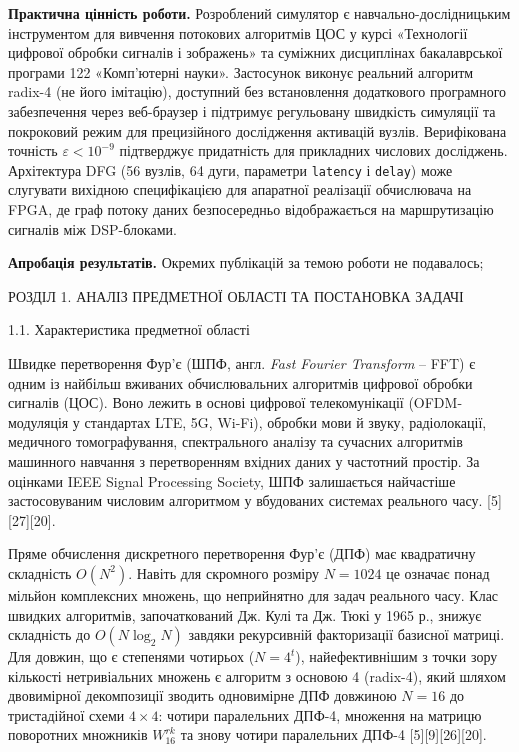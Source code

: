\documentclass[
]{article}
\newcommand{\passthrough}[1]{#1}
\begin{document}
\textbf{Практична цінність роботи.} Розроблений симулятор є
навчально-дослідницьким інструментом для вивчення потокових алгоритмів
ЦОС у курсі «Технології цифрової обробки сигналів і зображень» та
суміжних дисциплінах бакалаврської програми 122 «Комп'ютерні науки».
Застосунок виконує реальний алгоритм radix-4 (не його імітацію),
доступний без встановлення додаткового програмного забезпечення через
веб-браузер і підтримує регульовану швидкість симуляції та покроковий
режим для прецизійного дослідження активацій вузлів. Верифікована
точність \(\varepsilon < 10^{- 9}\) підтверджує придатність для
прикладних числових досліджень. Архітектура DFG (56 вузлів, 64 дуги,
параметри \passthrough{\lstinline!latency!} і
\passthrough{\lstinline!delay!}) може слугувати вихідною специфікацією
для апаратної реалізації обчислювача на FPGA, де граф потоку даних
безпосередньо відображається на маршрутизацію сигналів між DSP-блоками.

\textbf{Апробація результатів.} Окремих публікацій за темою роботи не
подавалось;

\protect{}\label{_Toc230737378}{}РОЗДІЛ 1. АНАЛІЗ
ПРЕДМЕТНОЇ ОБЛАСТІ ТА ПОСТАНОВКА ЗАДАЧІ

\protect{}\label{X351ee226d926b4af0b1030921408efbb323dbf0}{}1.1.
Характеристика предметної області

Швидке перетворення Фур'є (ШПФ, англ. \emph{Fast Fourier Transform} --
FFT) є одним із найбільш вживаних обчислювальних алгоритмів цифрової
обробки сигналів (ЦОС). Воно лежить в основі цифрової телекомунікації
(OFDM-модуляція у стандартах LTE, 5G, Wi-Fi), обробки мови й звуку,
радіолокації, медичного томографування, спектрального аналізу та
сучасних алгоритмів машинного навчання з перетворенням вхідних даних у
частотний простір. За оцінками IEEE Signal Processing Society, ШПФ
залишається найчастіше застосовуваним числовим алгоритмом у вбудованих
системах реального часу. {[}5{]}{[}27{]}{[}20{]}.

Пряме обчислення дискретного перетворення Фур'є (ДПФ) має квадратичну
складність \(O(N^{2})\). Навіть для скромного розміру \(N = 1024\) це
означає понад мільйон комплексних множень, що неприйнятно для задач
реального часу. Клас швидких алгоритмів, започаткований Дж. Кулі та Дж.
Тюкі у 1965 р., знижує складність до \(O(N\log_{2}N)\) завдяки
рекурсивній факторизації базисної матриці. Для довжин, що є степенями
чотирьох (\(N = 4^{t}\)), найефективнішим з точки зору кількості
нетривіальних множень є алгоритм з основою 4 (radix-4), який шляхом
двовимірної декомпозиції зводить одновимірне ДПФ довжиною \(N = 16\) до
тристадійної схеми \(4 \times 4\): чотири паралельних ДПФ-4, множення на
матрицю поворотних множників \(W_{16}^{rk}\) та знову чотири паралельних
ДПФ-4 {[}5{]}{[}9{]}{[}26{]}{[}20{]}.
\end{document}
